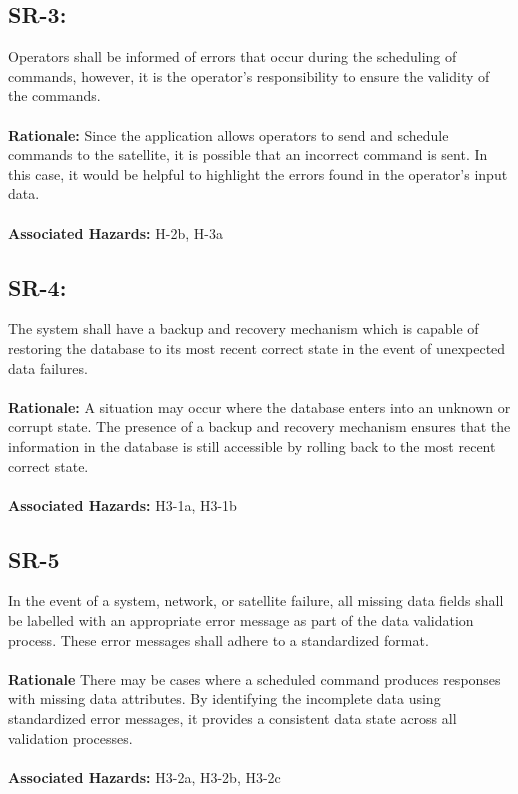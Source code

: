\documentclass{article}
\begin{document}
\subsection*{SR-3:}
Operators shall be informed of errors that occur during the scheduling of commands, however, it is the operator’s responsibility to ensure the validity of the commands. \\ \\
\textbf{Rationale:} Since the application allows operators to send and schedule commands to the satellite, it is possible that an incorrect command is sent.  In this case, it would be helpful to highlight the errors found in the operator’s input data.  \\ \\
\textbf{Associated Hazards:}  H-2b, H-3a

\subsection*{SR-4:}
The system shall have a backup and recovery mechanism which is capable of restoring the database to its most recent correct state in the event of unexpected data failures. \\ \\
\textbf{Rationale:} A situation may occur where the database enters into an unknown or corrupt state. The presence of a backup and recovery mechanism ensures that the information in the database is still accessible by rolling back to the most recent correct state.  \\ \\
\textbf{Associated Hazards:}  H3-1a, H3-1b

\subsection*{SR-5}
In the event of a system, network, or satellite failure, all missing data fields shall be labelled with an appropriate error message as part of the data validation process. These error messages shall adhere to a standardized format. \\ \\
\textbf{Rationale} There may be cases where a scheduled command produces responses with missing data attributes. By identifying the incomplete data using standardized error messages, it provides a consistent data state across all validation processes. \\ \\
\textbf{Associated Hazards:} H3-2a, H3-2b, H3-2c
\end{document}
